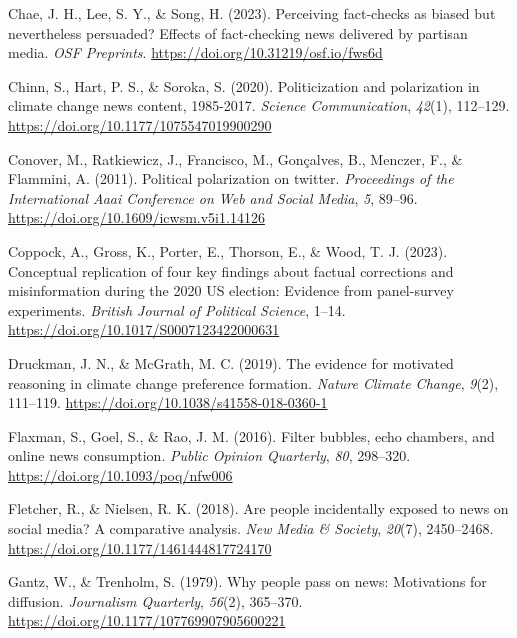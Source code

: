 \documentclass[
  12pt,
]{article}
\newlength{\cslhangindent}
\newlength{\cslentryspacingunit} %
\newenvironment{CSLReferences}[2] %
 {%
  \setlength{\parindent}{0pt}
  \ifodd #1
  \let\oldpar\par
  \def\par{\hangindent=\cslhangindent\oldpar}
  \fi
  \setlength{\parskip}{#2\cslentryspacingunit}
 }%
 {}
\begin{document}
\begin{CSLReferences}{1}{0}
\leavevmode{}%
Chae, J. H., Lee, S. Y., \& Song, H. (2023). Perceiving fact-checks as
biased but nevertheless persuaded? Effects of fact-checking news
delivered by partisan media. \emph{OSF Preprints}.
\url{https://doi.org/10.31219/osf.io/fws6d}

\leavevmode{}%
Chinn, S., Hart, P. S., \& Soroka, S. (2020). Politicization and
polarization in climate change news content, 1985-2017. \emph{Science
Communication}, \emph{42}(1), 112--129.
\url{https://doi.org/10.1177/1075547019900290}

\leavevmode{}%
Conover, M., Ratkiewicz, J., Francisco, M., Gonçalves, B., Menczer, F.,
\& Flammini, A. (2011). Political polarization on twitter.
\emph{Proceedings of the International Aaai Conference on Web and Social
Media}, \emph{5}, 89--96. \url{https://doi.org/10.1609/icwsm.v5i1.14126}

\leavevmode{}%
Coppock, A., Gross, K., Porter, E., Thorson, E., \& Wood, T. J. (2023).
Conceptual replication of four key findings about factual corrections
and misinformation during the 2020 US election: Evidence from
panel-survey experiments. \emph{British Journal of Political Science},
1--14. \url{https://doi.org/10.1017/S0007123422000631}

\leavevmode{}%
Druckman, J. N., \& McGrath, M. C. (2019). The evidence for motivated
reasoning in climate change preference formation. \emph{Nature Climate
Change}, \emph{9}(2), 111--119.
\url{https://doi.org/10.1038/s41558-018-0360-1}

\leavevmode{}%
Flaxman, S., Goel, S., \& Rao, J. M. (2016). Filter bubbles, echo
chambers, and online news consumption. \emph{Public Opinion Quarterly},
\emph{80}, 298--320. \url{https://doi.org/10.1093/poq/nfw006}

\leavevmode{}%
Fletcher, R., \& Nielsen, R. K. (2018). Are people incidentally exposed
to news on social media? A comparative analysis. \emph{New Media \&
Society}, \emph{20}(7), 2450--2468.
\url{https://doi.org/10.1177/1461444817724170}

\leavevmode{}%
Gantz, W., \& Trenholm, S. (1979). Why people pass on news: Motivations
for diffusion. \emph{Journalism Quarterly}, \emph{56}(2), 365--370.
\url{https://doi.org/10.1177/107769907905600221}


\end{CSLReferences}
\end{document}
